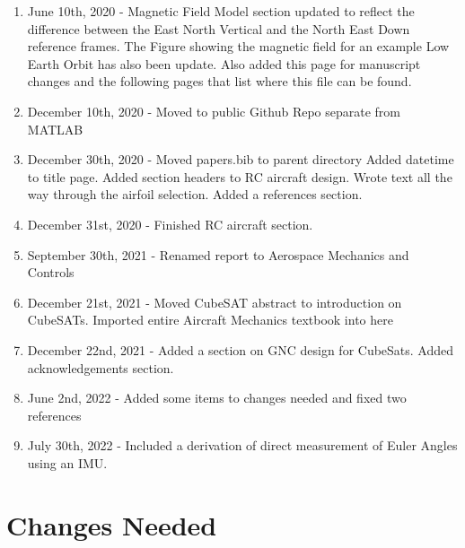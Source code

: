 \documentclass{article}
\begin{document}
\begin{enumerate}[itemsep=-5pt]
\item June 10th, 2020 - Magnetic Field Model section updated to
  reflect the difference between the East North Vertical and the North
  East Down reference frames. The Figure showing the magnetic field
  for an example Low Earth Orbit has also been update. Also added this
  page for manuscript changes and the following pages that list where
  this file can be found.
\item December 10th, 2020 - Moved to public Github Repo separate from
  MATLAB
\item December 30th, 2020 - Moved papers.bib to parent directory Added
  datetime to title page. Added  section headers to RC aircraft
  design. Wrote text all the way through the airfoil selection. Added
  a references section.
\item December 31st, 2020 - Finished RC aircraft section.
\item September 30th, 2021 - Renamed report to Aerospace Mechanics and
  Controls
\item December 21st, 2021 - Moved CubeSAT abstract to introduction on
  CubeSATs. Imported entire Aircraft Mechanics textbook into here
\item December 22nd, 2021 - Added a section on GNC design for
  CubeSats. Added acknowledgements section.
\item June 2nd, 2022 - Added some items to changes needed and fixed
  two references
\item July 30th, 2022 - Included a derivation of direct measurement of Euler Angles using an IMU.
\end{enumerate}

\section*{Changes Needed}
\end{document}
